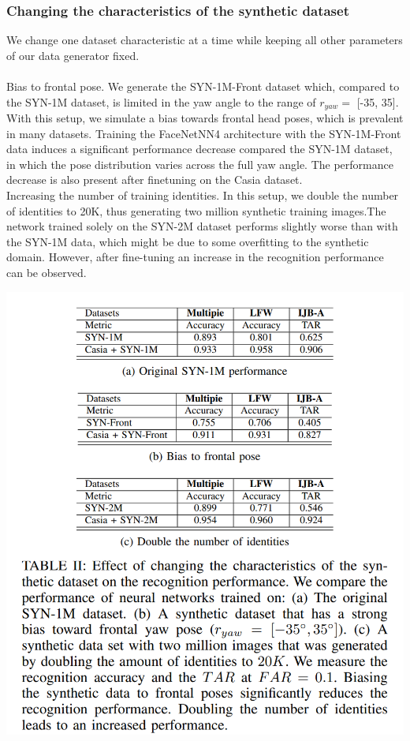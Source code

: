 \documentclass[12pt]{article}
\begin{document}
\subsubsection{Changing the characteristics of the synthetic dataset}
We change one dataset characteristic at a time while keeping all other parameters of our data generator fixed.\\
\\
Bias to frontal pose. We generate the SYN-1M-Front
dataset which, compared to the SYN-1M dataset, is limited
in the yaw angle to the range of $r_{yaw} =$ [-35, 35]. With
this setup, we simulate a bias towards frontal head poses,
which is prevalent in many datasets. Training the FaceNetNN4 architecture with the SYN-1M-Front data induces a significant performance decrease compared the SYN-1M dataset,
in which the pose distribution varies across the full yaw angle. The performance decrease is also present after finetuning on the Casia dataset.\\
Increasing the number of training identities. In this setup,
we double the number of identities to 20K, thus generating
two million synthetic training images.The network trained solely on the SYN-2M
dataset performs slightly worse than with the SYN-1M data,
which might be due to some overfitting to the synthetic domain. However, after fine-tuning an increase in the recognition
performance can be observed.
\begin{center}
  \includegraphics[scale = 1]{img11.png}
\end{center}
\end{document}
